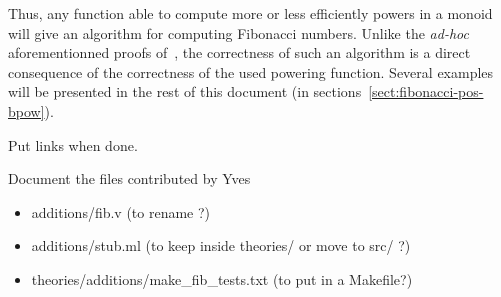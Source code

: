 Thus, any function able to compute more or less efficiently powers in a monoid will
give an algorithm for computing Fibonacci numbers. Unlike the \emph{ad-hoc} aforementionned proofs of~\cite{BC04}, the correctness of such an algorithm is a direct consequence 
of the correctness of the used powering function.
Several examples will be presented in the rest of this document
(in sections~\vref{sect:fibonacci-pos-bpow}).

\begin{todo}
Put links when done.
\end{todo}









\begin{todo}
Document the files contributed by Yves
\begin{itemize}
\item additions/fib.v (to rename ?)
\item additions/stub.ml (to keep inside theories/ or move to src/ ?)
\item theories/additions/make\_fib\_tests.txt (to put in a Makefile?)
\end{itemize}
\end{todo}







